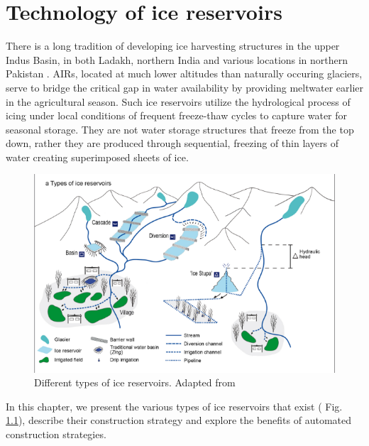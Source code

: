 \chapter{Technology of ice reservoirs}
\label{chap:tech}


There is a long tradition of developing ice harvesting structures in the upper Indus Basin, in both Ladakh,
northern India \citep{labbalTraditionalOasesLadakh2000, nusserIrrigationDevelopmentUpper2012} and various
locations in northern Pakistan \citep{kreutzmannScarcityOpulenceWater2011}. AIRs, located at much lower altitudes
than naturally occuring glaciers, serve to bridge the critical gap in water availability by providing
meltwater earlier in the agricultural season. Such ice reservoirs utilize the hydrological process of icing
under local conditions of frequent freeze-thaw cycles to capture water for seasonal storage. They are not water
storage structures that freeze from the top down, rather they are produced through sequential, freezing of thin
layers of water creating superimposed sheets of ice.

\begin{figure}[htb]
\centering
\includegraphics[width=\textwidth]{figs/AIR_designs}
\caption{Different types of ice reservoirs. Adapted from \cite{nusserSociohydrologyArtificialGlaciers2019}}
\label{fig:AIRdesigns}
\end{figure}

In this chapter, we present the various types of ice reservoirs that exist ( Fig. \ref{fig:AIRdesigns}),
describe their construction strategy and explore the benefits of automated construction strategies.


